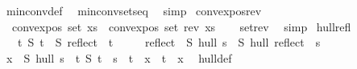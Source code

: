 \begin{isabellebody}
\ min{\isacharunderscore}{\kern0pt}conv{\isacharunderscore}{\kern0pt}def\ \isamarkupfalse%
\ min{\isacharunderscore}{\kern0pt}conv{\isacharunderscore}{\kern0pt}sets{\isacharunderscore}{\kern0pt}eq\ \isamarkupfalse%
\ simp%
\endisatagproof
{\isafoldproof}%
%
\isadelimproof
\isanewline
%
\endisadelimproof
\isanewline
\isanewline
\isanewline
{}\isamarkupfalse%
\ convex{\isacharunderscore}{\kern0pt}pos{\isacharunderscore}{\kern0pt}rev{\isacharcolon}{\kern0pt}\isanewline
\ \ {\isachardoublequoteopen}convex{\isacharunderscore}{\kern0pt}pos\ {\isacharparenleft}{\kern0pt}set\ xs{\isacharparenright}{\kern0pt}\ {\isasymLongrightarrow}\ convex{\isacharunderscore}{\kern0pt}pos\ {\isacharparenleft}{\kern0pt}set\ {\isacharparenleft}{\kern0pt}rev\ xs{\isacharparenright}{\kern0pt}{\isacharparenright}{\kern0pt}{\isachardoublequoteclose}\isanewline
%
\isadelimproof
\ \ %
\endisadelimproof
%
\isatagproof
{}\isamarkupfalse%
\ set{\isacharunderscore}{\kern0pt}rev\ \isamarkupfalse%
\ simp%
\endisatagproof
{\isafoldproof}%
%
\isadelimproof
\isanewline
%
\endisadelimproof
\isanewline
{}\isamarkupfalse%
\ hull{\isacharunderscore}{\kern0pt}refl{\isacharcolon}{\kern0pt}\isanewline
\ \ \ {\isachardoublequoteopen}{\isasymforall}t{\isachardot}{\kern0pt}\ S\ t\ {\isacharequal}{\kern0pt}\ S\ {\isacharparenleft}{\kern0pt}reflect\ {\isacharbackquote}{\kern0pt}\ t{\isacharparenright}{\kern0pt}{\isachardoublequoteclose}\isanewline
\ \ \ \ \ {\isachardoublequoteopen}reflect\ {\isacharbackquote}{\kern0pt}\ {\isacharparenleft}{\kern0pt}S\ hull\ s{\isacharparenright}{\kern0pt}\ {\isacharequal}{\kern0pt}\ S\ hull\ {\isacharparenleft}{\kern0pt}reflect\ {\isacharbackquote}{\kern0pt}\ s{\isacharparenright}{\kern0pt}{\isachardoublequoteclose}\isanewline
%
\isadelimproof
%
\endisadelimproof
%
\isatagproof
{}\isamarkupfalse%
{\isacharminus}{\kern0pt}\isanewline
\ \ \isamarkupfalse%
\ {}{\isacharcolon}{\kern0pt}{\isachardoublequoteopen}{\isacharparenleft}{\kern0pt}x\ {\isasymin}\ S\ hull\ s{\isacharparenright}{\kern0pt}\ {\isasymlongleftrightarrow}\ {\isacharparenleft}{\kern0pt}{\isasymforall}t{\isachardot}{\kern0pt}\ S\ t\ {\isasymand}\ s\ {\isasymsubseteq}\ t\ {\isasymlongrightarrow}\ x\ {\isasymin}\ t{\isacharparenright}{\kern0pt}{\isachardoublequoteclose}\ \ x\ \isamarkupfalse%
\ hull{\isacharunderscore}{\kern0pt}def\ \isamarkupfalse%

\end{isabellebody}
